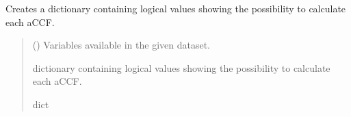 \documentclass[a4paper,11pt,english]{sphinxmanual}
\begin{document}
\begin{fulllineitems}
\label{\detokenize{modules:climaccf.extract_data.logic_cal_accfs}}
\pysigstartsignatures
{}
\pysigstopsignatures
\sphinxAtStartPar
Creates a dictionary containing logical values showing the possibility to calculate each aCCF.
\begin{quote}\begin{description}
\sphinxAtStartPar
{} () \textendash{} Variables available in the given dataset.

\sphinxAtStartPar
dictionary containing logical values showing the possibility to calculate each aCCF.

\sphinxAtStartPar
dict

\end{description}\end{quote}

\end{fulllineitems}

\label{\detokenize{modules:module-climaccf.extend_dim}}
\end{document}
